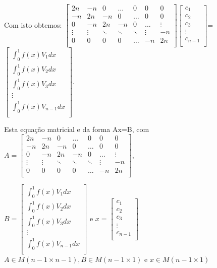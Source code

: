 \documentclass[a4paper]{article}
\begin{document}
 Com isto obtemos: \(\begin{bmatrix}
 2n & -n & 0 & \dots & 0 & 0 & 0  \\
 -n & 2n & -n & 0 & \dots & 0 & 0 \\
 0 & -n & 2n & -n & 0 & \dots & \vdots \\
 \vdots & \vdots & \ddots & \ddots & \ddots & \vdots & -n \\
 0 & 0 & 0 & 0 & \dots & -n & 2n \\
 \end{bmatrix}\)\(\begin{bmatrix}
 c_1 \\
 c_2 \\
 c_3 \\
 \vdots \\
 c_{n-1} \\
 \end{bmatrix}\)=\(\begin{bmatrix}
 \int_{0}^{1}f(x)V_1dx \\
 \int_{0}^{1}f(x)V_2dx \\
 \int_{0}^{1}f(x)V_3dx \\
 \vdots \\
 \int_{0}^{1}f(x)V_{n-1}dx \\
 \end{bmatrix}\).
 
 
 
 Esta equação matricial e da forma Ax=B, com  \(A=\begin{bmatrix}
 2n & -n & 0 & \dots & 0 & 0 & 0  \\
 -n & 2n & -n & 0 & \dots & 0 & 0 \\
 0 & -n & 2n & -n & 0 & \dots & \vdots \\
 \vdots & \vdots & \ddots & \ddots & \ddots & \vdots & -n \\
 0 & 0 & 0 & 0 & \dots & -n & 2n \\
 \end{bmatrix}\),
 
 \(B=\begin{bmatrix}
 \int_{0}^{1}f(x)V_1dx \\
 \int_{0}^{1}f(x)V_2dx \\
 \int_{0}^{1}f(x)V_3dx \\
 \vdots \\
 \int_{0}^{1}f(x)V_{n-1}dx \\
 \end{bmatrix}\) e \(x=\begin{bmatrix}
 c_1 \\
 c_2 \\
 c_3 \\
 \vdots \\
 c_{n-1} \\
 \end{bmatrix}\) \(A \in M(n-1 \times n-1), B \in M(n-1 \times 1)\) e \(x \in M(n-1 \times 1)\)
 
\end{document}
